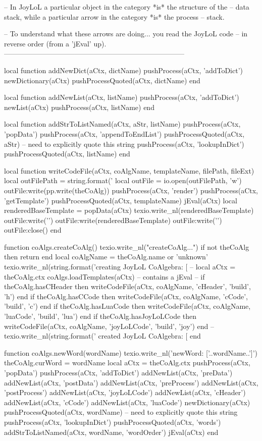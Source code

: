 -- In JoyLoL a particular object in the category *is* the structure of the 
-- data stack, while a particular arrow in the category *is* the process 
-- stack.

-- To understand what these arrows are doing... you read the JoyLoL code 
-- in reverse order (from a 'jEval' up). 
-----------------------------------------------------------------------------

local function addNewDict(aCtx, dictName)
  pushProcess(aCtx, 'addToDict')
  newDictionary(aCtx)
  pushProcessQuoted(aCtx, dictName)
end

local function addNewList(aCtx, listName)
  pushProcess(aCtx, 'addToDict')
  newList(aCtx)
  pushProcess(aCtx, listName)
end

local function addStrToListNamed(aCtx, aStr, listName)
  pushProcess(aCtx, 'popData')
  pushProcess(aCtx, 'appendToEndList')
  pushProcessQuoted(aCtx, aStr) -- need to explicitly quote this string
  pushProcess(aCtx, 'lookupInDict')
  pushProcessQuoted(aCtx, listName)
end

local function writeCodeFile(aCtx, coAlgName, templateName, filePath, fileExt)
  local outFilePath = string.format('%
  local outFile = io.open(outFilePath, 'w')
  outFile:write(pp.write(theCoAlg))
  pushProcess(aCtx, 'render')
  pushProcess(aCtx, 'getTemplate')
  pushProcessQuoted(aCtx, templateName)
  jEval(aCtx)
  local renderedBaseTemplate = popData(aCtx)
  texio.write_nl(renderedBaseTemplate)
  outFile:write('\n')
  outFile:write(renderedBaseTemplate)
  outFile:write('\n')
  outFile:close()
end

function coAlgs.createCoAlg()
  texio.write_nl("createCoAlg...")
  if not theCoAlg then return end
  local coAlgName = theCoAlg.name or 'unknown'
  texio.write_nl(string.format('creating JoyLoL CoAlgebra: [%
  --
  local aCtx = theCoAlg.ctx
  coAlgs.loadTemplates(aCtx) -- contains a jEval
  --
  if theCoAlg.hasCHeader    then writeCodeFile(aCtx, coAlgName, 'cHeader',    'build', 'h')   end
  if theCoAlg.hasCCode      then writeCodeFile(aCtx, coAlgName, 'cCode',      'build', 'c')   end
  if theCoAlg.hasLuaCode    then writeCodeFile(aCtx, coAlgName, 'luaCode',    'build', 'lua') end
  if theCoAlg.hasJoyLoLCode then writeCodeFile(aCtx, coAlgName, 'joyLoLCode', 'build', 'joy') end
  --
  texio.write_nl(string.format(' created JoyLoL CoAlgebra: [%
end

function coAlgs.newWord(wordName)
  texio.write_nl('newWord: ['..wordName..']')
  theCoAlg.curWord    = wordName
  local aCtx = theCoAlg.ctx
  pushProcess(aCtx, 'popData')
  pushProcess(aCtx, 'addToDict')
  addNewList(aCtx, 'preData')
  addNewList(aCtx, 'postData')
  addNewList(aCtx, 'preProcess')
  addNewList(aCtx, 'postProcess')
  addNewList(aCtx, 'joyLoLCode')
  addNewList(aCtx, 'cHeader')
  addNewList(aCtx, 'cCode')
  addNewList(aCtx, 'luaCode')
  newDictionary(aCtx)
  pushProcessQuoted(aCtx, wordName) -- need to explicitly quote this string
  pushProcess(aCtx, 'lookupInDict')
  pushProcessQuoted(aCtx, 'words')
  addStrToListNamed(aCtx, wordName, 'wordOrder')
  jEval(aCtx)
end

